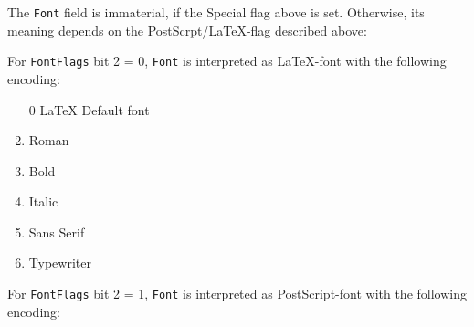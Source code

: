 \documentclass[10pt, a4paper]{article}
\begin{document}
The \texttt{Font} field is immaterial, if the Special flag above is set. 
Otherwise, its meaning depends on the PostScrpt/\LaTeX-flag 
described above: 

For \texttt{FontFlags} bit 2 = 0, 
\texttt{Font} is interpreted as \LaTeX-font with the following encoding: 
%
\begin{enumerate}
\item[0] \LaTeX{} Default font
\item    Roman
\item    Bold
\item    Italic
\item    Sans Serif
\item    Typewriter
\end{enumerate}

For \texttt{FontFlags} bit 2 = 1, 
\texttt{Font} is interpreted as PostScript-font with the following encoding: 
\end{document}
